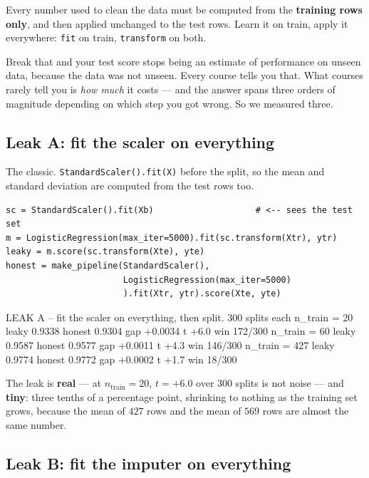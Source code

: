 \documentclass[11pt]{article}
\begin{document}
\begin{keyidea}
Every number used to clean the data must be computed from the \textbf{training
rows only}, and then applied unchanged to the test rows. Learn it on train,
apply it everywhere: \texttt{fit} on train, \texttt{transform} on both.
\end{keyidea}

Break that and your test score stops being an estimate of performance on unseen
data, because the data was not unseen. Every course tells you that. What courses
rarely tell you is \emph{how much} it costs --- and the answer spans three
orders of magnitude depending on which step you got wrong. So we measured
three.

\subsection{Leak A: fit the scaler on everything}

The classic. \texttt{StandardScaler().fit(X)} before the split, so the mean and
standard deviation are computed from the test rows too.

\begin{lstlisting}
sc = StandardScaler().fit(Xb)                    # <-- sees the test set
m = LogisticRegression(max_iter=5000).fit(sc.transform(Xtr), ytr)
leaky = m.score(sc.transform(Xte), yte)
honest = make_pipeline(StandardScaler(),
                       LogisticRegression(max_iter=5000)
                       ).fit(Xtr, ytr).score(Xte, yte)
\end{lstlisting}
\begin{codeout}
LEAK A -- fit the scaler on everything, then split.  300 splits each
  n_train = 20  leaky 0.9338  honest 0.9304  gap +0.0034  t  +6.0  win 172/300
  n_train = 60  leaky 0.9587  honest 0.9577  gap +0.0011  t  +4.3  win 146/300
  n_train = 427 leaky 0.9774  honest 0.9772  gap +0.0002  t  +1.7  win 18/300
\end{codeout}

The leak is \textbf{real} --- at $n_{\text{train}} = 20$, $t = +6.0$ over
$300$ splits is not noise --- and \textbf{tiny}: three tenths of a percentage
point, shrinking to nothing as the training set grows, because the mean of
$427$ rows and the mean of $569$ rows are almost the same number.

\subsection{Leak B: fit the imputer on everything}
\end{document}
